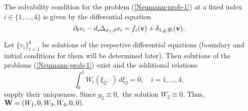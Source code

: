 \documentclass[reqno]{amsart}            %
\numberwithin{equation}{section}
\begin{document}
The solvability condition for the problem (\ref{Neumann-prob-1}) at a fixed index $i\in \{1,\ldots,4\}$ is given by the differential equation
 \begin{equation}\label{limit-eqs}
   \partial_t {v}_i - d_i \Delta_{x_1, \vartheta}v_i  = f_i({\bf v}) + \delta_{1, \varrho} \, g_i({\bf v}).
 \end{equation}

 Let $\{v_i\}_{i=1}^6$ be solutions of the respective differential equations (boundary and initial  conditions for them
will be determined later). Then  solutions of the problems (\ref{Neumann-prob-1}) exist and the additional relations
 \begin{equation}\label{midle-val}
\int_0^1 {W}_i(\xi_2,\cdot)\, d\xi_2 = 0, \quad  i=1,\ldots,4,
\end{equation}
 supply their  uniqueness. Since $g_2 \equiv 0,$ the solution ${W}_2 \equiv 0.$
Thus,  ${\bf W}=(W_1, 0, W_3, W_4, 0, 0).$
\end{document}
